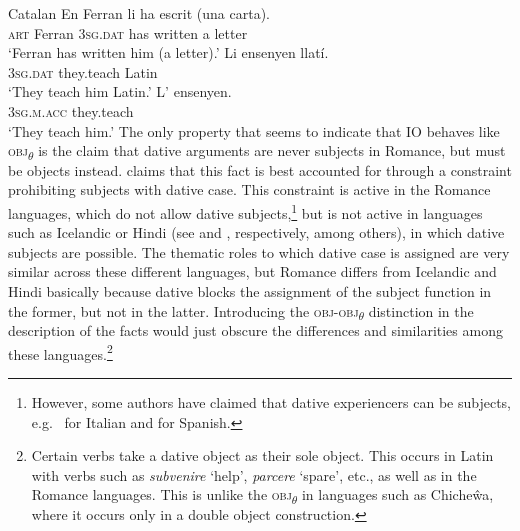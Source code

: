\documentclass[output=paper,hidelinks]{langscibook}
\begin{document}
\ea\label{ex:Romance:35}  Catalan \citep[172]{alsina1996the-role}
\ea\label{ex:Romance:35a}
\gll En Ferran li ha escrit (una carta).\\
    \textsc{art} Ferran 3\textsc{sg.dat} has written a letter\\
\glt   `Ferran has written him (a letter).'
\ex\label{ex:Romance:35b}
\gll
 Li ensenyen llatí.\\
       3\textsc{sg.dat} they.teach Latin\\
\glt   `They teach him Latin.'
\ex\label{ex:Romance:35c}
\gll L' ensenyen.\\
       3\textsc{sg.m.}\textsc{acc} they.teach\\
\glt   `They teach him.'
\z\z
The only property that seems to indicate that IO behaves like \textsc{obj}\textsubscript{$\theta$} is the claim that dative arguments are never subjects in Romance, but must be objects instead. \citet{alsina1996the-role} claims that this fact is best accounted for through a constraint prohibiting subjects with dative case. This constraint is active in the Romance languages, which do not allow dative subjects,\footnote{However, some authors have claimed that dative experiencers can be subjects, e.g.\ \citet{Cardinaletti2004} for Italian and \citet{FernandezSoriano1999} for Spanish.} but is not active in languages such as Icelandic or Hindi (see \citealt{ZMT85:Case} and \citealt{MohananT1994}, respectively, among others), in which dative subjects are possible. The thematic roles to which dative case is assigned are very similar across these different languages, but Romance differs from Icelandic and Hindi basically because dative blocks the assignment of the subject function in the former, but not in the latter. Introducing the \textsc{obj}{}-\textsc{obj}\textsubscript{$\theta$} distinction in the description of the facts would just obscure the differences and similarities among these languages.\footnote{Certain verbs take a dative object as their sole object. This occurs in Latin with verbs such as \textit{subvenire} `help', \textit{parcere} `spare', etc., as well as in the Romance languages. This is unlike the \textsc{obj}\textsubscript{$\theta$} in languages such as Chiche\^wa, where it occurs only in a double object construction.}
\end{document}
